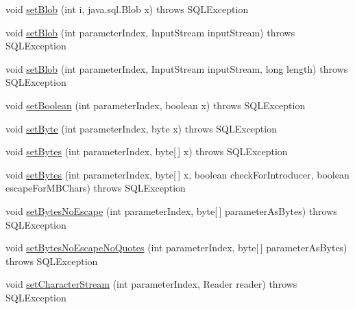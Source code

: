\begin{DoxyCompactItemize}
\item 
void \mbox{\hyperlink{classcom_1_1mysql_1_1cj_1_1jdbc_1_1_client_prepared_statement_ad0b80b80ac330a7dcd4826a33029eb12}{set\+Blob}} (int i, java.\+sql.\+Blob x)  throws S\+Q\+L\+Exception 
\item 
void \mbox{\hyperlink{classcom_1_1mysql_1_1cj_1_1jdbc_1_1_client_prepared_statement_ad19cc4ca302d112eba0ead88a37e4357}{set\+Blob}} (int parameter\+Index, Input\+Stream input\+Stream)  throws S\+Q\+L\+Exception 
\item 
void \mbox{\hyperlink{classcom_1_1mysql_1_1cj_1_1jdbc_1_1_client_prepared_statement_a43750d9f82655361a63c4755ff0113bd}{set\+Blob}} (int parameter\+Index, Input\+Stream input\+Stream, long length)  throws S\+Q\+L\+Exception 
\item 
void \mbox{\hyperlink{classcom_1_1mysql_1_1cj_1_1jdbc_1_1_client_prepared_statement_aff14b242a73b51061bae28bce07747c8}{set\+Boolean}} (int parameter\+Index, boolean x)  throws S\+Q\+L\+Exception 
\item 
void \mbox{\hyperlink{classcom_1_1mysql_1_1cj_1_1jdbc_1_1_client_prepared_statement_ab19c3165f63658984b938f1b58a2addd}{set\+Byte}} (int parameter\+Index, byte x)  throws S\+Q\+L\+Exception 
\item 
void \mbox{\hyperlink{classcom_1_1mysql_1_1cj_1_1jdbc_1_1_client_prepared_statement_af5c3e969b12901953490898fa6346ad6}{set\+Bytes}} (int parameter\+Index, byte\mbox{[}$\,$\mbox{]} x)  throws S\+Q\+L\+Exception 
\item 
void \mbox{\hyperlink{classcom_1_1mysql_1_1cj_1_1jdbc_1_1_client_prepared_statement_ae32665d789135291c132d6f7cff0d136}{set\+Bytes}} (int parameter\+Index, byte\mbox{[}$\,$\mbox{]} x, boolean check\+For\+Introducer, boolean escape\+For\+M\+B\+Chars)  throws S\+Q\+L\+Exception 
\item 
void \mbox{\hyperlink{classcom_1_1mysql_1_1cj_1_1jdbc_1_1_client_prepared_statement_a7db4bf1c51418004ea1482b72d2c7913}{set\+Bytes\+No\+Escape}} (int parameter\+Index, byte\mbox{[}$\,$\mbox{]} parameter\+As\+Bytes)  throws S\+Q\+L\+Exception 
\item 
void \mbox{\hyperlink{classcom_1_1mysql_1_1cj_1_1jdbc_1_1_client_prepared_statement_a268b6e65cc67b813b8a4348498f3861b}{set\+Bytes\+No\+Escape\+No\+Quotes}} (int parameter\+Index, byte\mbox{[}$\,$\mbox{]} parameter\+As\+Bytes)  throws S\+Q\+L\+Exception 
\item 
void \mbox{\hyperlink{classcom_1_1mysql_1_1cj_1_1jdbc_1_1_client_prepared_statement_a5cf80174809557f14d69598a40a63dde}{set\+Character\+Stream}} (int parameter\+Index, Reader reader)  throws S\+Q\+L\+Exception 

\end{DoxyCompactItemize}
